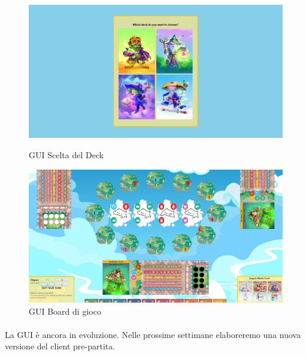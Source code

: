 \documentclass[a4paper, 12pt]{article}
\begin{document}
	\begin{figure}[!htb]
		\begin{minipage}{0.495\textwidth}
			\centering
			\includegraphics[width=\linewidth]{gui2Week9.png}
			\caption{GUI Scelta del Deck}
		\end{minipage}\hfill
		\begin{minipage}{0.495\textwidth}
			\centering
			\includegraphics[width=\linewidth]{guiWeek9.png}
			\caption{GUI Board di gioco}
		\end{minipage}
	\end{figure}
	\paragraph{}
	La GUI è ancora in evoluzione. Nelle prossime settimane elaboreremo una nuova versione del client pre-partita.
	
	\newpage
\end{document}
